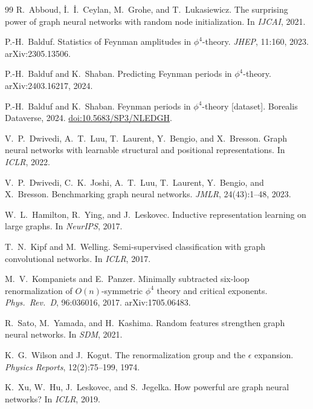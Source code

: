 \documentclass[11pt]{article}
\begin{document}

\begin{thebibliography}{99}\small
{}
R.~Abboud, \.I.~\.I.~Ceylan, M.~Grohe, and T.~Lukasiewicz.
\newblock The surprising power of graph neural networks with random node initialization.
\newblock In \emph{IJCAI}, 2021.

P.-H.~Balduf.
\newblock Statistics of {F}eynman amplitudes in $\phi^4$-theory.
\newblock \emph{JHEP}, 11:160, 2023. arXiv:2305.13506.

P.-H.~Balduf and K.~Shaban.
\newblock Predicting {F}eynman periods in $\phi^4$-theory.
\newblock arXiv:2403.16217, 2024.

P.-H.~Balduf and K.~Shaban.
\newblock Feynman periods in $\phi^4$-theory [dataset].
\newblock Borealis Dataverse, 2024. \href{https://doi.org/10.5683/SP3/NLEDGH}{doi:10.5683/SP3/NLEDGH}.

V.~P.~Dwivedi, A.~T.~Luu, T.~Laurent, Y.~Bengio, and X.~Bresson.
\newblock Graph neural networks with learnable structural and positional representations.
\newblock In \emph{ICLR}, 2022.

V.~P.~Dwivedi, C.~K.~Joshi, A.~T.~Luu, T.~Laurent, Y.~Bengio, and X.~Bresson.
\newblock Benchmarking graph neural networks.
\newblock \emph{JMLR}, 24(43):1--48, 2023.

W.~L.~Hamilton, R.~Ying, and J.~Leskovec.
\newblock Inductive representation learning on large graphs.
\newblock In \emph{NeurIPS}, 2017.

T.~N.~Kipf and M.~Welling.
\newblock Semi-supervised classification with graph convolutional networks.
\newblock In \emph{ICLR}, 2017.

M.~V.~Kompaniets and E.~Panzer.
\newblock Minimally subtracted six-loop renormalization of $O(n)$-symmetric $\phi^4$ theory and critical exponents.
\newblock \emph{Phys.\ Rev.\ D}, 96:036016, 2017. arXiv:1705.06483.

R.~Sato, M.~Yamada, and H.~Kashima.
\newblock Random features strengthen graph neural networks.
\newblock In \emph{SDM}, 2021.

K.~G.~Wilson and J.~Kogut.
\newblock The renormalization group and the $\epsilon$ expansion.
\newblock \emph{Physics Reports}, 12(2):75--199, 1974.

K.~Xu, W.~Hu, J.~Leskovec, and S.~Jegelka.
\newblock How powerful are graph neural networks?
\newblock In \emph{ICLR}, 2019.
\end{thebibliography}
\end{document}
